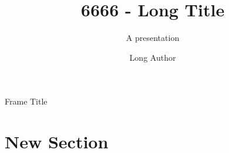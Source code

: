 \documentclass[aspectratio=169]{beamer}
\title[S. Title]{6666 - Long Title}
\subtitle{A presentation}
\author[S. Author]{Long Author}
\date{}
\institute{}
\begin{document}
\begin{frame}{Frame Title}
    \lipsum[1]
\end{frame}

\section{New Section}

\begin{frame}
    \begin{theorem}
        \lipsum[1]
    \end{theorem}
\end{frame}
\end{document}

